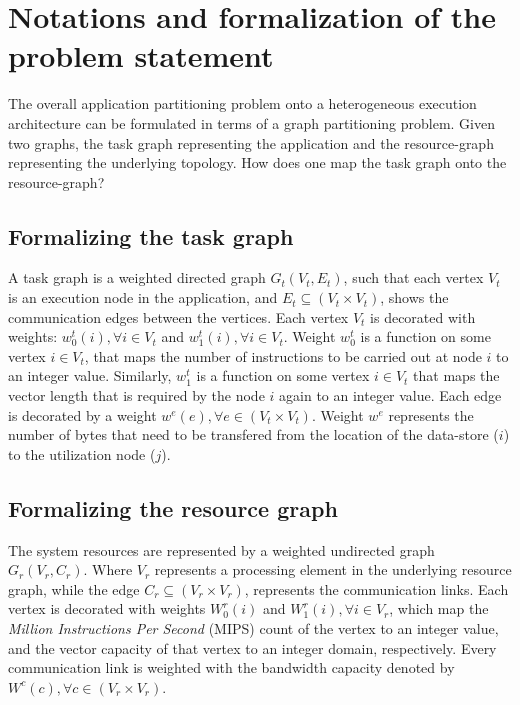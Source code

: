 \section{Notations and formalization of the problem statement}
\label{sec:relat-notat-form}

The overall application partitioning problem onto a heterogeneous
execution architecture can be formulated in terms of a graph
partitioning problem. Given two graphs, the task graph representing the
application and the resource-graph representing the underlying
topology. How does one map the task graph onto the resource-graph?


\subsection{Formalizing the task graph}
\label{sec:form-task-graph}

A task graph is a weighted directed graph $G_t(V_t,E_t)$, such that each
vertex $V_t$ is an execution node in the application, and \mbox{$E_t
  \subseteq (V_t \times V_t)$}, shows the communication edges between
the vertices. Each vertex $V_t$ is decorated with weights: $w^t_0(i),
\forall i \in V_t$ and $w^t_1(i), \forall i \in V_t$. Weight $w^t_0$ is
a function on some vertex $i \in V_t$, that maps the number of
instructions to be carried out at node $i$ to an integer
value. Similarly, $w^t_1$ is a function on some vertex $i \in V_t$ that
maps the vector length that is required by the node $i$ again to an
integer value. Each edge is decorated by a weight $w^e(e), \forall e \in
(V_t \times V_t)$. Weight $w^e$ represents the number of bytes that need
to be transfered from the location of the data-store ($i$) to the
utilization node ($j$).


\subsection{Formalizing the resource graph}
\label{sec:form-reso-graph}

The system resources are represented by a weighted undirected graph
$G_r(V_r,C_r)$. Where $V_r$ represents a processing element in the
underlying resource graph, while the edge $C_r \subseteq (V_r \times
V_r)$, represents the communication links. Each vertex is decorated with
weights $W^r_0(i)$ and $W^r_1(i), \forall i \in V_r$, which map the
\textit{Million Instructions Per Second} (MIPS) count of the vertex to
an integer value, and the vector capacity of that vertex to an integer
domain, respectively. Every communication link is weighted with the
bandwidth capacity denoted by $W^c(c), \forall c \in (V_r \times V_r)$.

